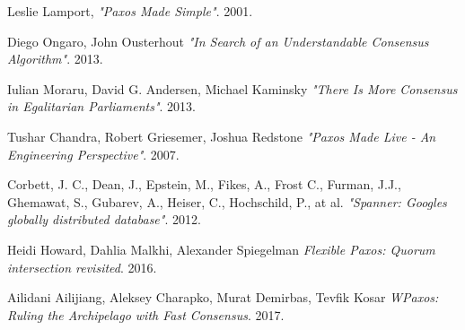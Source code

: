\documentclass[12pt]{article}
\begin{document}
\newpage

\begin{thebibliography}{9}

  Leslie Lamport,
  \emph{"Paxos Made Simple"}.
  2001.

  Diego Ongaro, John Ousterhout
  \emph{"In Search of an Understandable Consensus Algorithm"}.
  2013.

  Iulian Moraru, David G. Andersen, Michael Kaminsky
  \emph{"There Is More Consensus in Egalitarian Parliaments"}.
  2013.

  Tushar Chandra, Robert Griesemer, Joshua Redstone
  \emph{"Paxos Made Live - An Engineering Perspective"}.
  2007.

  Corbett, J. C., Dean, J., Epstein, M., Fikes, A., Frost C., Furman, J.J., Ghemawat, S., Gubarev, A., Heiser, C., Hochschild, P., at al.
  \emph{"Spanner: Googles globally distributed database"}.
  2012.

  Heidi Howard, Dahlia Malkhi, Alexander Spiegelman
  \emph{Flexible Paxos: Quorum intersection revisited}.
  2016.

  Ailidani Ailijiang, Aleksey Charapko, Murat Demirbas, Tevfik Kosar
  \emph{WPaxos: Ruling the Archipelago with Fast Consensus}.
  2017.

\end{thebibliography}
\end{document}
